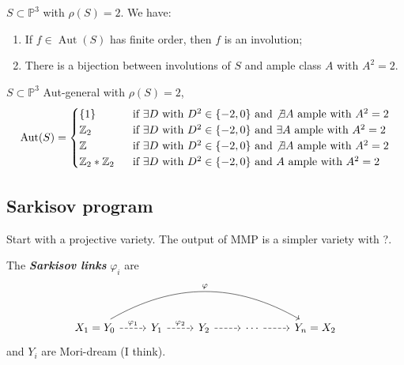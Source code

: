 \begin{prop}\leavevmode
\(S \subset \mathbb{P}^3\) with \(\rho(S)=2\). We have:
\begin{enumerate}
\item  If \(f \in \operatorname{Aut}(S)\) has finite order, then \(f\) is an involution;
\item There is a bijection between involutions of \(S\) and ample class \(A\) with \(A^2=2.\)
\end{enumerate}
\end{prop}

\begin{prop}\leavevmode
\(S \subset \mathbb{P}^3\) Aut-general with \(\rho(S)=2\),
\[\operatorname{Aut}(S)=\begin{cases}
	\{1\}\qquad & \text{ if \(\exists D\) with \(D^2 \in \{-2,0\}\) and \(\not\exists  A\) ample with \(A^2=2\)} \\
	\mathbb{Z}_2\qquad &\text{ if \(\exists D\) with \(D^2 \in \{-2,0\}\) and \(\exists  A\) ample with \(A^2=2\)}\\
	\mathbb{Z} & \text{ if \(\exists D\) with \(D^2 \in \{-2,0\}\) and \(\not\exists  A\) ample with \(A^2=2\)}\\
	\mathbb{Z}_2 * \mathbb{Z}_2 & \text{ if \(\exists D\) with \(D^2 \in \{-2,0\}\) and \( A\) ample with \(A^2=2\)}
\end{cases}\]
\end{prop}

\subsection{Sarkisov program}

Start with a projective variety. The output of MMP is a simpler variety with ?.

\begin{thm}\leavevmode
	The  \textit{\textbf{Sarkisov links}}  $\varphi_i$ are
	\[\begin{tikzcd}
		X_1=Y_0\arrow[r,dashed,"\varphi_1"]\arrow[rrrr,bend left,"\varphi"]&Y_1\arrow[r,dashed,"\varphi_2"]&Y_2\arrow[r,dashed]&\cdots \arrow[r,dashed]&Y_n=X_2
	\end{tikzcd}\]
	and \(Y_i\) are Mori-dream (I think).
\end{thm}

\begin{defn}\leavevmode 
\end{defn}

